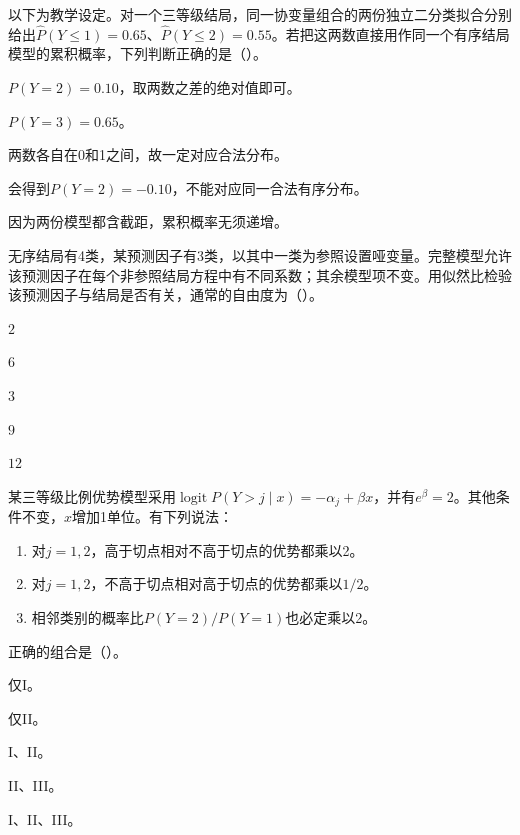 \par\noindent\begin{minipage}{\linewidth}
以下为教学设定。对一个三等级结局，同一协变量组合的两份独立二分类拟合分别给出$\widehat P(Y\le1)=0.65$、$\widehat P(Y\le2)=0.55$。若把这两数直接用作同一个有序结局模型的累积概率，下列判断正确的是（\quad）。
\begin{choices}
\item $P(Y=2)=0.10$，取两数之差的绝对值即可。
\item $P(Y=3)=0.65$。
\item 两数各自在0和1之间，故一定对应合法分布。
\item 会得到$P(Y=2)=-0.10$，不能对应同一合法有序分布。
\item 因为两份模型都含截距，累积概率无须递增。
\end{choices}
\end{minipage}\par\medskip

\par\noindent\begin{minipage}{\linewidth}
无序结局有4类，某预测因子有3类，以其中一类为参照设置哑变量。完整模型允许该预测因子在每个非参照结局方程中有不同系数；其余模型项不变。用似然比检验该预测因子与结局是否有关，通常的自由度为（\quad）。
\begin{choices}
\item $2$
\item $6$
\item $3$
\item $9$
\item $12$
\end{choices}
\end{minipage}\par\medskip

\par\noindent\begin{minipage}{\linewidth}
某三等级比例优势模型采用$\operatorname{logit}P(Y>j\mid x)=-\alpha_j+\beta x$，并有$e^\beta=2$。其他条件不变，$x$增加1单位。有下列说法：\begin{enumerate}\renewcommand{\labelenumi}{\Roman{enumi}.}\item 对$j=1,2$，高于切点相对不高于切点的优势都乘以2。\item 对$j=1,2$，不高于切点相对高于切点的优势都乘以$1/2$。\item 相邻类别的概率比$P(Y=2)/P(Y=1)$也必定乘以2。\end{enumerate}正确的组合是（\quad）。
\begin{choices}
\item 仅I。
\item 仅II。
\item I、II。
\item II、III。
\item I、II、III。
\end{choices}
\end{minipage}\par\medskip

